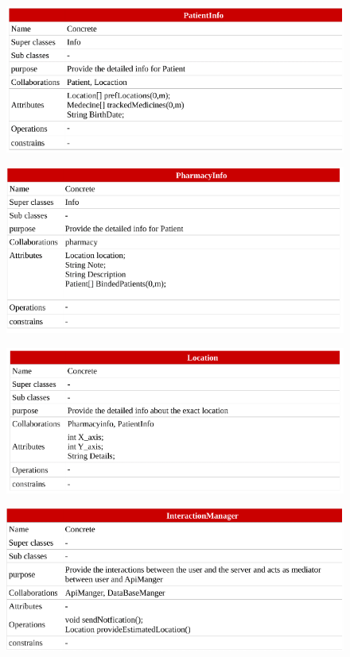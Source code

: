 \documentclass[]{article}
\begin{document}
\begin{figure}[H]
\centering
\includegraphics[scale=0.4]{./classdiagram/description/13}
\end{figure}

\begin{figure}[H]
\centering
\includegraphics[scale=0.4]{./classdiagram/description/14}
\end{figure}

\begin{figure}[H]
\centering
\includegraphics[scale=0.4]{./classdiagram/description/15}
\end{figure}

\begin{figure}[H]
\centering
\includegraphics[scale=0.4]{./classdiagram/description/16}
\end{figure}
\end{document}
